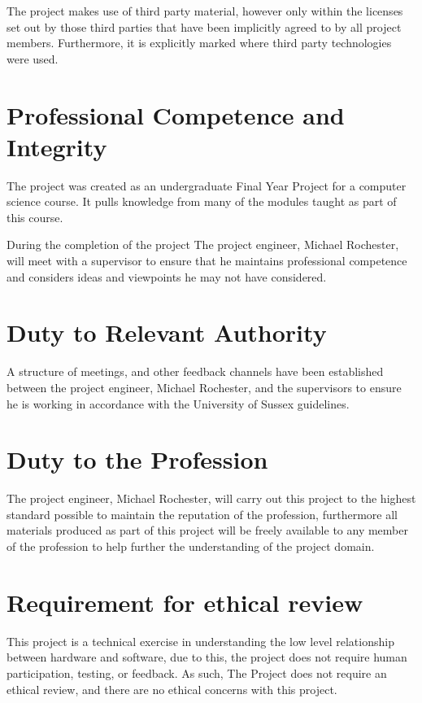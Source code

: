 \documentclass[a4paper]{report}
\begin{document}
The project makes use of third party material, however only within the licenses set out by those third parties that have been implicitly agreed to by all project members. Furthermore, it is explicitly marked where third party technologies were used.


\section{Professional Competence and Integrity}

The project was created as an undergraduate Final Year Project for a computer science course. It pulls knowledge from many of the modules taught as part of this course.

During the completion of the project The project engineer, Michael Rochester, will meet with a supervisor to ensure that he maintains professional competence and considers ideas and viewpoints he may not have considered.

\section{Duty to Relevant Authority}

A structure of meetings, and other feedback channels have been established between the project engineer, Michael Rochester, and the supervisors to ensure he is working in accordance with the University of Sussex guidelines.

\section{Duty to the Profession}

The project engineer, Michael Rochester, will carry out this project to the highest standard possible to maintain the reputation of the profession, furthermore all materials produced as part of this project will be freely available to any member of the profession to help further the understanding of the project domain.

\section{Requirement for ethical review}

This project is a technical exercise in understanding the low level relationship between hardware and software, due to this, the project does not require human participation, testing, or feedback. As such, The Project does not require an ethical review, and there are no ethical concerns with this project.
\end{document}
